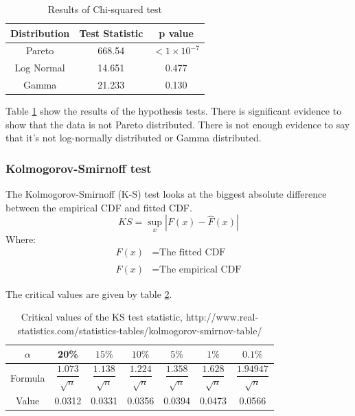 \documentclass[titlepage]{article}
\begin{document}
		
	\begin{table}[H]
		\begin{center}
			\begin{tabular}{ |c|cc|}
				\hline
				Distribution & Test Statistic &      p value       \\ \hline
				Pareto       & 668.54         & $<1\times 10^{-7}$ \\
				Log Normal   & 14.651         &       0.477        \\
				Gamma        & 21.233         &       0.130        \\ 
				\hline
			\end{tabular} 
		\end{center}
		\caption{Results of Chi-squared test} \label{T1:chi-sq results}
	\end{table}

	Table \ref{T1:chi-sq results} show the results of the hypothesis tests. There is significant evidence to show that the data is not Pareto distributed. There is not enough evidence to say that it's not log-normally distributed or Gamma distributed.
	
	\subsubsection{Kolmogorov-Smirnoff test}
	The Kolmogorov-Smirnoff (K-S) test looks at the biggest absolute difference between the empirical CDF and fitted CDF.
	$$KS = \sup_x |F(x) - \hat{F}(x)|$$
	Where:
	\begin{align*}
		F(x) &= \text{The fitted CDF}\\
		\hat{F}(x) &= \text{The empirical CDF}
	\end{align*}
	
	The critical values are given by table \ref{T1: KS critical values}.
	
	\begin{table}[H]
		\begin{center}
		\begin{tabular}{|c|cccccc|}
			\hline
			$ \alpha $ & 20\% & $ 15\% $ & $ 10\% $ & $ 5\% $ & $ 1\% $ & $ 0.1\% $ \\ \midrule
			Formula & $\dfrac{1.073}{\sqrt{n}}$ & $\dfrac{1.138}{\sqrt{n}}$ & $\dfrac{1.224}{\sqrt{n}}$ & $\dfrac{1.358}{\sqrt{n}}$ & $\dfrac{1.628}{\sqrt{n}}$ & $\dfrac{1.94947}{\sqrt{n}}$ \\\midrule
			Value & 0.0312 & 0.0331 & 0.0356 & 0.0394 & 0.0473 & 0.0566 \\\hline
		\end{tabular} \caption{Critical values of the KS test statistic, http://www.real-statistics.com/statistics-tables/kolmogorov-smirnov-table/} \label{T1: KS critical values}
	\end{center}
	\end{table}
\end{document}
